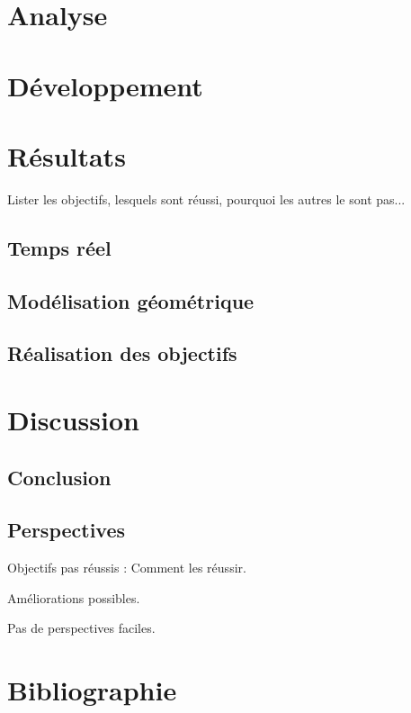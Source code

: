 \documentclass[a4paper,12pt,notitlepage]{report}
\begin{document}

\vspace*{\fill}

\vspace*{\fill}

\tableofcontents



\chapter{Analyse}



\chapter{Développement}








\chapter{Résultats}
Lister les objectifs, lesquels sont réussi, pourquoi les autres le sont pas...
\section{Temps réel}
\section{Modélisation géométrique}
\section{Réalisation des objectifs}

\chapter{Discussion}
\section{Conclusion}
\section{Perspectives}
Objectifs pas réussis : Comment les réussir.

Améliorations possibles.

Pas de perspectives faciles.


\chapter{Bibliographie}
\nocite{*} %
\printbibliography
\end{document}
